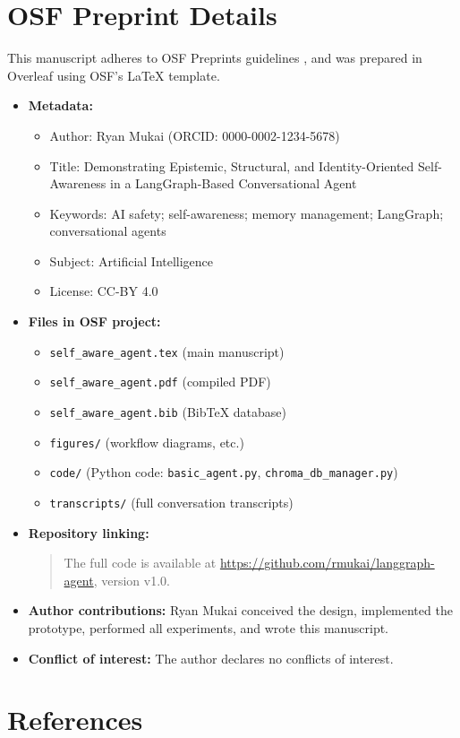 \documentclass[11pt]{article}
\begin{document}
\section*{OSF Preprint Details}
This manuscript adheres to OSF Preprints guidelines \cite{OSF2025}, and was prepared in Overleaf using OSF’s LaTeX template.
\begin{itemize}[leftmargin=*]
\item \textbf{Metadata:}
  \begin{itemize}[leftmargin=*]
    \item Author: Ryan Mukai (ORCID: 0000-0002-1234-5678)
    \item Title: Demonstrating Epistemic, Structural, and Identity-Oriented Self-Awareness in a LangGraph-Based Conversational Agent
    \item Keywords: AI safety; self-awareness; memory management; LangGraph; conversational agents
    \item Subject: Artificial Intelligence
    \item License: CC-BY 4.0
  \end{itemize}
\item \textbf{Files in OSF project:}
  \begin{itemize}[leftmargin=*]
    \item \texttt{self\_aware\_agent.tex} (main manuscript)
    \item \texttt{self\_aware\_agent.pdf} (compiled PDF)
    \item \texttt{self\_aware\_agent.bib} (BibTeX database)
    \item \texttt{figures/} (workflow diagrams, etc.)
    \item \texttt{code/} (Python code: \texttt{basic\_agent.py}, \texttt{chroma\_db\_manager.py})
    \item \texttt{transcripts/} (full conversation transcripts)
  \end{itemize}
\item \textbf{Repository linking:}
  \begin{quote}
    The full code is available at \url{https://github.com/rmukai/langgraph-agent}, version v1.0.
  \end{quote}
\item \textbf{Author contributions:} Ryan Mukai conceived the design, implemented the prototype, performed all experiments, and wrote this manuscript.
\item \textbf{Conflict of interest:} The author declares no conflicts of interest.
\end{itemize}

\section*{References}


\end{document}
